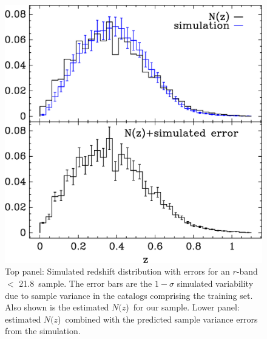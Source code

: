 \documentclass[preprint]{aastex}
\newcommand{\rmax}{21.8}
\newcommand{\nofz}{$N(z$)}
\begin{document}
\begin{figure}[t]\centering
    \includegraphics[scale=0.6]{figures/nzsigf-edges-12-nofz-sim-errors-2panel.eps}

    \caption{Top panel: Simulated redshift distribution with errors for an
    $r$-band $<$ \rmax\ sample.  The error bars are the $1-\sigma$ simulated
    variability due to sample variance in the catalogs comprising the training
    set.  Also shown is the estimated \nofz\ for our sample.  Lower panel:
    estimated \nofz\ combined with the predicted sample variance errors from
    the simulation.}

    \label{fig:ebars}
    \vspace{2em}
\end{figure}

\end{document}
